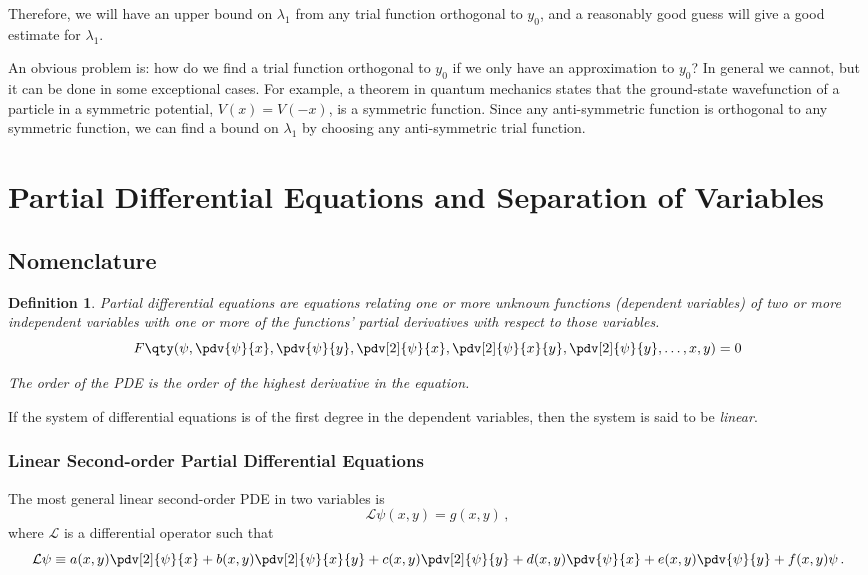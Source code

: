 \documentclass{article}
\theoremstyle{plain}\theoremheaderfont{\normalfont\itshape}\theorembodyfont{\rmfamily}\theoremseparator{.}\newtheorem*{rem}{Remark}\newtheorem*{ex}{Example}\newtheorem*{proof}{Proof}\newtheorem*{altp}{Alternative proof}
\theoremstyle{plain}\theoremheaderfont{\normalfont\bfseries}\theorembodyfont{\rmfamily}\theoremseparator{.}\newtheorem{thm}{Theorem}[section]\newtheorem{lem}[thm]{Lemma}\newtheorem{prop}[thm]{Proposition}\newtheorem*{cor}{Corollary}\newtheorem{defn}[thm]{Definition}\newtheorem{clm}[thm]{Claim}\newtheorem{clminproof}{Claim}
\theoremstyle{break}\theoremheaderfont{\normalfont\itshape}\theorembodyfont{\rmfamily}\theoremseparator{.\medskip}\newtheorem*{proofskip}{Proof}\newtheorem*{exs}{Examples}\newtheorem*{rems}{Remarks}
\theoremstyle{break}\theoremheaderfont{\normalfont\bfseries}\theorembodyfont{\rmfamily}\theoremseparator{.\medskip}\newtheorem{lemskip}[thm]{Lemma}\newtheorem{defnskip}[thm]{Definition}\newtheorem{propskip}[thm]{Proposition}\newtheorem{thmskip}[thm]{Theorem}
\numberwithin{equation}{section}
\begin{document}
	Therefore, we will have an upper bound on \(\lambda_1\) from any trial function orthogonal to \(y_0\), and a reasonably good guess will give a good estimate for \(\lambda_1\).

	An obvious problem is: how do we find a trial function orthogonal to \(y_0\) if we only have an approximation to \(y_0\)? In general we cannot, but it can be done in some exceptional cases. For example, a theorem in quantum mechanics states that the ground-state wavefunction of a particle in a symmetric potential, \(V(x)=V(-x)\), is a symmetric function. Since any anti-symmetric function is orthogonal to any symmetric function, we can find a bound on \(\lambda_1\) by choosing any anti-symmetric trial function.
	\newpage

	\section{Partial Differential Equations and Separation of Variables}
	\subsection{Nomenclature}
	\begin{defn}
		\textit{Partial differential equations} are equations relating one or more unknown functions (dependent variables) of two or more independent variables with one or more of the functions' partial derivatives with respect to those variables.
		\[F\qty(\psi,\pdv{\psi}{x},\pdv{\psi}{y},\pdv[2]{\psi}{x},\pdv[2]{\psi}{x}{y},\pdv[2]{\psi}{y},\dots,x,y)=0\]
		
		The \textit{order} of the PDE is the order of the highest derivative in the equation.
	\end{defn}
	
	If the system of differential equations is of the first degree in the dependent variables, then the system is said to be \textit{linear}.
	
	\subsubsection{Linear Second-order Partial Differential Equations}
	The most general linear second-order PDE in two variables is
	\[\mathcal{L}\psi(x,y)=g(x,y)\,,\]
	where \(\mathcal{L}\) is a differential operator such that
	\[\mathcal{L}\psi\equiv a(x,y)\pdv[2]{\psi}{x}+b(x,y)\pdv[2]{\psi}{x}{y}+c(x,y)\pdv[2]{\psi}{y}+d(x,y)\pdv{\psi}{x}+e(x,y)\pdv{\psi}{y}+f(x,y)\psi\,.\]
	
\end{document}
